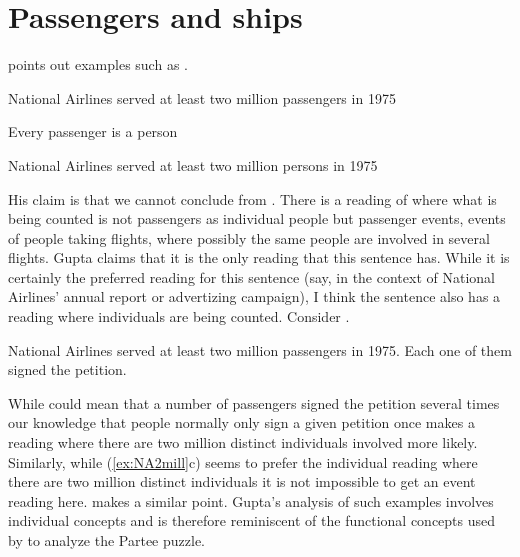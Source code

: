 

  

\section{Passengers and ships}
\label{sec:passengers}
\cite{Gupta1980} points out examples such as \nexteg{}.
\begin{ex} 
\begin{subex} 
 
\item National Airlines served at least two million passengers in 1975 
 
\item Every passenger is a person

\item National Airlines served at least two million persons in 1975 
 
\end{subex} 
\label{ex:NA2mill}   
\end{ex} 
His claim is that we cannot conclude  from .
There is a reading of  where what is being counted is not
passengers as individual people but passenger events, events of people
taking flights, where possibly the same people are involved in several
flights.  Gupta claims that it is the only reading that this
sentence has.  While it is certainly the preferred reading for this
sentence (say, in the context of National Airlines' annual report or
advertizing campaign), I think the sentence also has a reading where
individuals are being counted.  Consider \nexteg{}.
\begin{ex} 
National Airlines served at least two million passengers in 1975.
Each one of them signed the petition.  
\end{ex} 
While \preveg{} could mean that a number of passengers signed the
petition several times our knowledge that people normally only sign a
given petition once makes a reading where there are two million
distinct individuals involved more likely.  Similarly, while
(\ref{ex:NA2mill}c) seems to prefer the individual reading where there
are two million distinct individuals it is not impossible to get an
event reading here.  \cite{Krifka1990} makes a similar point.
Gupta's analysis of such examples involves individual concepts and is
therefore reminiscent of the functional concepts used by
\cite{Lobner1979,Lobner1981} to analyze the Partee puzzle.


